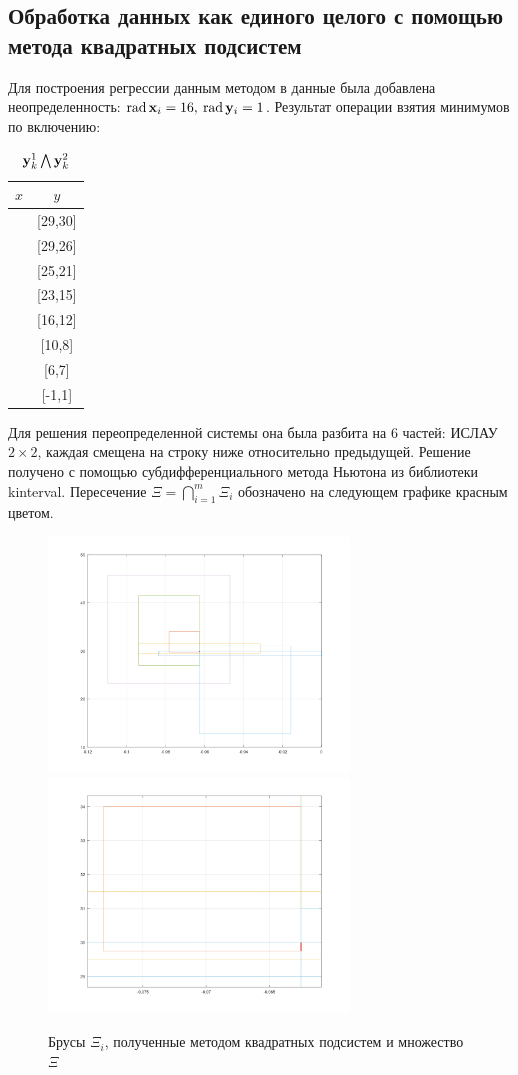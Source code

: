 \documentclass[a4paper]{article}
\begin{document}
\subsection{Обработка данных как единого целого с помощью метода квадратных подсистем}
Для построения регрессии данным методом в данные была добавлена неопределенность: $\operatorname{rad}\mathbf{x}_i=16,\:\operatorname{rad}\mathbf{y}_i=1$. Результат операции взятия минимумов по включению:
\begin{table}[H]
    \centering
    \begin{tabular}{|c|c|}
        \hline
         $x$&$y$  \\
         \hline
         [-16,16]&[29,30]\\
         \hline
         [48,80]&[29,26]\\
         \hline
         [112,144]&[25,21]\\
         \hline
         [176,208]&[23,15]\\
         \hline
         [240,272]&[16,12]\\
         \hline
         [304,336]&[10,8]\\
         \hline
         [368,400]&[6,7]\\
         \hline
         [432,464]&[-1,1]\\
         \hline
    \end{tabular}
    \caption{$\mathbf{y}_k^1\bigwedge\mathbf{y}_k^2$}
    \label{tab:kint}
\end{table}
Для решения переопределенной системы она была разбита на 6 частей: ИСЛАУ $2\times2$, каждая смещена на строку ниже относительно предыдущей. Решение получено с помощью субдифференциального метода Ньютона из библиотеки kinterval. Пересечение $\Xi=\bigcap_{i=1}^m\Xi_i$ обозначено на следующем графике красным цветом.
\begin{figure}[H]
    \centering
    \includegraphics[width=8cm]{img/boxes.png}
    \includegraphics[width=8cm]{img/boxes_close.png}
    \caption{Брусы $\Xi_i$, полученные методом квадратных подсистем и множество $\Xi$}
    \label{fig:boxes}
\end{figure}
\end{document}
